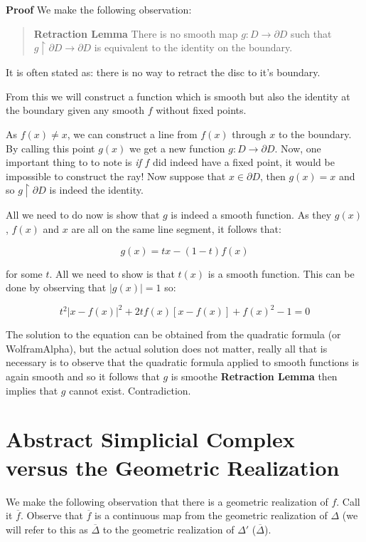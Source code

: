 \documentclass[a4paper]{article}
\newcommand{\ol}{\overline}
\begin{document}
\textbf{Proof} We make the following observation: 

\begin{quote}
    \textbf{Retraction Lemma} There is no smooth map $g : D \to \partial D$ such that $g \upharpoonright \partial D \to \partial D$ is equivalent to the identity on the boundary.
\end{quote}

It is often stated as: there is no way to retract the disc to it's boundary.

From this we will construct a function which is smooth but also the identity at the boundary given any smooth $f$ without fixed points.

As $f(x) \neq x$, we can construct a line from $f(x)$ through $x$ to the boundary. By calling this point $g(x)$ we get a new function $g : D \to \partial D$. Now, one important thing to to note is \textit{if} $f$ did indeed have a fixed point, it would be impossible to construct the ray! Now suppose that $x \in \partial D$, then $g(x) = x$ and so $g \upharpoonright \partial D$ is indeed the identity.

All we need to do now is show that $g$ is indeed a smooth function. As they $g(x)$, $f(x)$ and $x$ are all on the same line segment, it follows that:

$$g(x) = tx - (1 - t)f(x)$$

for some $t$. All we need to show is that $t(x)$ is a smooth function. This can be done by observing that $|g(x)| = 1$ so:

$$t^2|x - f(x)|^2 + 2tf(x)[x - f(x)] + f(x)^2 - 1 = 0$$

The solution to the equation can be obtained from the quadratic formula (or WolframAlpha), but the actual solution does not matter, really all that is necessary is to observe that the quadratic formula applied to smooth functions is again smooth and so it follows that $g$ is smoothe \textbf{Retraction Lemma} then implies that $g$ cannot exist. Contradiction.

\section{Abstract Simplicial Complex versus the Geometric Realization}

We make the following observation that there is a geometric realization of $f$. Call it $\ol{f}$. Observe that $\ol{f}$ is a continuous map from the geometric realization of $\Delta$ (we will refer to this as $\ol{\Delta}$ to the geometric realization of $\Delta'$ ($\ol{\Delta}$).
\end{document}
